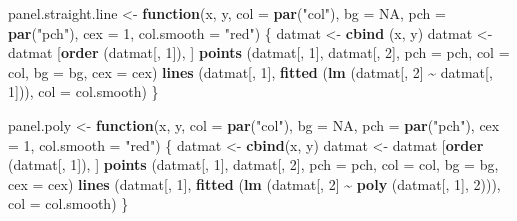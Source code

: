 \documentclass[
]{book}
\newenvironment{Shaded}{\begin{snugshade}}{\end{snugshade}}
\newcommand{\AttributeTok}[1]{\textcolor[rgb]{0.13,0.29,0.53}{#1}}
\newcommand{\ConstantTok}[1]{\textcolor[rgb]{0.56,0.35,0.01}{#1}}
\newcommand{\ControlFlowTok}[1]{\textcolor[rgb]{0.13,0.29,0.53}{\textbf{#1}}}
\newcommand{\DecValTok}[1]{\textcolor[rgb]{0.00,0.00,0.81}{#1}}
\newcommand{\FunctionTok}[1]{\textcolor[rgb]{0.13,0.29,0.53}{\textbf{#1}}}
\newcommand{\NormalTok}[1]{#1}
\newcommand{\OtherTok}[1]{\textcolor[rgb]{0.56,0.35,0.01}{#1}}
\newcommand{\SpecialCharTok}[1]{\textcolor[rgb]{0.81,0.36,0.00}{\textbf{#1}}}
\newcommand{\StringTok}[1]{\textcolor[rgb]{0.31,0.60,0.02}{#1}}
\begin{document}
\begin{Shaded}
\begin{Highlighting}[]
\NormalTok{panel.straight.line }\OtherTok{\textless{}{-}} \ControlFlowTok{function}\NormalTok{(x, y, }\AttributeTok{col =} \FunctionTok{par}\NormalTok{(}\StringTok{"col"}\NormalTok{), }\AttributeTok{bg =} \ConstantTok{NA}\NormalTok{, }
                                \AttributeTok{pch =} \FunctionTok{par}\NormalTok{(}\StringTok{"pch"}\NormalTok{), }\AttributeTok{cex =} \DecValTok{1}\NormalTok{, }\AttributeTok{col.smooth =} \StringTok{"red"}\NormalTok{)}
\NormalTok{\{ datmat }\OtherTok{\textless{}{-}} \FunctionTok{cbind}\NormalTok{ (x, y)}
\NormalTok{  datmat }\OtherTok{\textless{}{-}}\NormalTok{ datmat [}\FunctionTok{order}\NormalTok{ (datmat[, }\DecValTok{1}\NormalTok{]),  ]}
  \FunctionTok{points}\NormalTok{ (datmat[, }\DecValTok{1}\NormalTok{], datmat[, }\DecValTok{2}\NormalTok{], }\AttributeTok{pch =}\NormalTok{ pch, }\AttributeTok{col =}\NormalTok{ col, }\AttributeTok{bg =}\NormalTok{ bg, }\AttributeTok{cex =}\NormalTok{ cex)}
  \FunctionTok{lines}\NormalTok{ (datmat[, }\DecValTok{1}\NormalTok{], }\FunctionTok{fitted}\NormalTok{ (}\FunctionTok{lm}\NormalTok{ (datmat[, }\DecValTok{2}\NormalTok{] }\SpecialCharTok{\textasciitilde{}}\NormalTok{ datmat[, }\DecValTok{1}\NormalTok{])), }\AttributeTok{col =}\NormalTok{ col.smooth)}
\NormalTok{\}}

\NormalTok{panel.poly }\OtherTok{\textless{}{-}} \ControlFlowTok{function}\NormalTok{(x, y, }\AttributeTok{col =} \FunctionTok{par}\NormalTok{(}\StringTok{"col"}\NormalTok{), }\AttributeTok{bg =} \ConstantTok{NA}\NormalTok{, }\AttributeTok{pch =} \FunctionTok{par}\NormalTok{(}\StringTok{"pch"}\NormalTok{), }
                       \AttributeTok{cex =} \DecValTok{1}\NormalTok{, }\AttributeTok{col.smooth =} \StringTok{"red"}\NormalTok{)}
\NormalTok{\{ datmat }\OtherTok{\textless{}{-}} \FunctionTok{cbind}\NormalTok{(x, y)}
\NormalTok{  datmat }\OtherTok{\textless{}{-}}\NormalTok{ datmat [}\FunctionTok{order}\NormalTok{ (datmat[, }\DecValTok{1}\NormalTok{]),  ]}
  \FunctionTok{points}\NormalTok{ (datmat[, }\DecValTok{1}\NormalTok{], datmat[, }\DecValTok{2}\NormalTok{], }\AttributeTok{pch =}\NormalTok{ pch, }\AttributeTok{col =}\NormalTok{ col, }\AttributeTok{bg =}\NormalTok{ bg, }\AttributeTok{cex =}\NormalTok{ cex)}
  \FunctionTok{lines}\NormalTok{ (datmat[, }\DecValTok{1}\NormalTok{], }\FunctionTok{fitted}\NormalTok{ (}\FunctionTok{lm}\NormalTok{ (datmat[, }\DecValTok{2}\NormalTok{] }\SpecialCharTok{\textasciitilde{}} \FunctionTok{poly}\NormalTok{ (datmat[, }\DecValTok{1}\NormalTok{], }\DecValTok{2}\NormalTok{))), }
         \AttributeTok{col =}\NormalTok{ col.smooth)}
\NormalTok{\}}
               

\end{Highlighting}
\end{Shaded}
\end{document}
